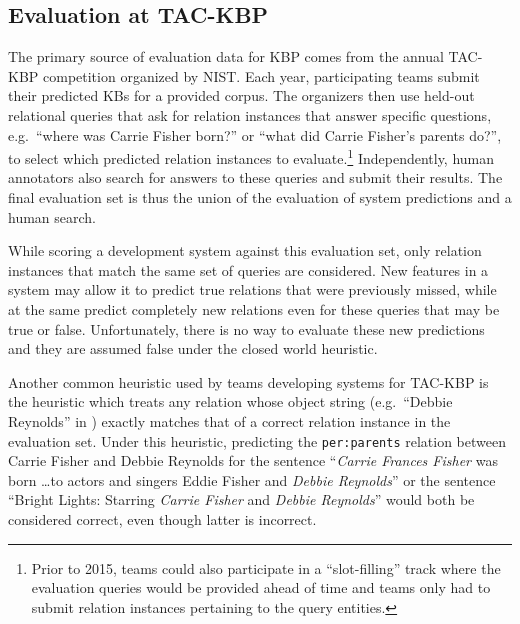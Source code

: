\subsection{Evaluation at TAC-KBP}

The primary source of evaluation data for KBP comes from the annual TAC-KBP competition organized by NIST.\@ %
Each year, participating teams submit their predicted KBs for a provided corpus.
The organizers then use held-out relational queries that ask for relation instances that answer specific questions, e.g.\ ``where was Carrie Fisher born?'' or ``what did Carrie Fisher's parents do?'', to select which predicted relation instances to evaluate.\footnote{%
  Prior to 2015, teams could also participate in a ``slot-filling'' track where the evaluation queries would be provided ahead of time and teams only had to submit relation instances pertaining to the query entities.}
Independently, human annotators also search for answers to these queries and submit their results.
The final evaluation set is thus the union of the evaluation of system predictions and a human search.

While scoring a development system against this evaluation set, only relation instances that match the same set of queries are considered.
New features in a system may allow it to predict true relations that were previously missed, while at the same predict completely new relations even for these queries that may be true or false.
Unfortunately, there is no way to evaluate these new predictions and they are assumed false under the closed world heuristic.

Another common heuristic used by teams developing systems for TAC-KBP is the \anydoc{} heuristic which treats any relation whose object string (e.g.\ ``Debbie Reynolds'' in ) exactly matches that of a correct relation instance in the evaluation set.
Under this heuristic, predicting the \texttt{per:parents} relation between Carrie Fisher and Debbie Reynolds for the sentence ``\textit{Carrie Frances Fisher} was born \ldots to actors and singers Eddie Fisher and \textit{Debbie Reynolds}'' or the sentence ``Bright Lights: Starring \textit{Carrie Fisher} and \textit{Debbie Reynolds}'' would both be considered correct, even though latter is incorrect.


